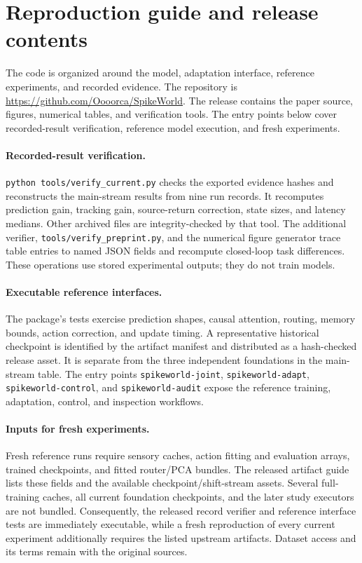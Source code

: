 \section{Reproduction guide and release contents}
\label{app:release}
The code is organized around the model, adaptation interface, reference
experiments, and recorded evidence. The repository is
\url{https://github.com/Oooorca/SpikeWorld}. The release contains the paper source, figures, numerical tables, and
verification tools. The entry points below cover recorded-result verification,
reference model execution, and fresh experiments.

\paragraph{Recorded-result verification.}
\texttt{python tools/verify\_current.py} checks the exported evidence hashes
and reconstructs the main-stream results from nine run records. It recomputes
prediction gain, tracking gain, source-return correction, state sizes, and
latency medians. Other archived files are integrity-checked by that tool.
The additional verifier, \texttt{tools/verify\_preprint.py}, and the numerical
figure generator trace table entries to named JSON fields and recompute
closed-loop task differences.
These operations use stored experimental outputs; they do not train models.

\paragraph{Executable reference interfaces.}
The package's tests exercise prediction shapes, causal attention, routing,
memory bounds, action correction, and update timing. A representative
historical checkpoint is identified by the artifact manifest and distributed
as a hash-checked release asset. It is separate from the three independent
foundations in the main-stream table. The entry points
\texttt{spikeworld-joint}, \texttt{spikeworld-adapt},
\texttt{spikeworld-control}, and \texttt{spikeworld-audit} expose the reference
training, adaptation, control, and inspection workflows.

\paragraph{Inputs for fresh experiments.}
Fresh reference runs require sensory caches, action fitting and evaluation
arrays, trained checkpoints, and fitted router/PCA bundles. The released
artifact guide lists these fields and the available checkpoint/shift-stream
assets. Several full-training caches, all current foundation checkpoints,
and the later study executors are not bundled. Consequently, the released
record verifier and reference interface tests are immediately executable,
while a fresh reproduction of every current experiment additionally requires
the listed upstream artifacts. Dataset access and its terms remain with the
original sources.

